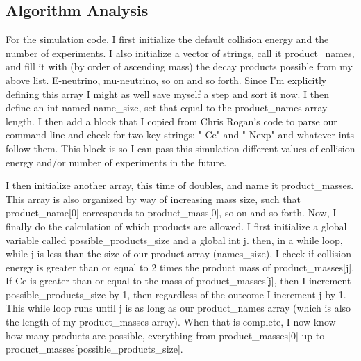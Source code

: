 \documentclass[11pt]{article}
\begin{document}
\subsection*{Algorithm Analysis}
For the simulation code, I first initialize the default collision energy and the number of experiments. I also initialize a vector of strings, call it product\_names, and fill it with (by order of ascending mass) the decay products possible from my above list. E-neutrino, mu-neutrino, so on and so forth. Since I'm explicitly defining this array I might as well save myself a step and sort it now. I then define an int named name\_size, set that equal to the product\_names array length. I then add a block that I copied from Chris Rogan's code to parse our command line and check for two key strings: "-Ce" and "-Nexp" and whatever ints follow them. This block is so I can pass this simulation different values of collision energy and/or number of experiments in the future. 

I then initialize another array, this time of doubles, and name it product\_masses. This array is also organized by way of increasing mass size, such that product\_name[0] corresponds to product\_mass[0], so on and so forth. Now, I finally do the calculation of which products are allowed. I first initialize a global variable called possible\_products\_size and a global int j. then, in a while loop, while j is less than the size of our product array (names\_size), I check if collision energy is greater than or equal to 2 times the product mass of product\_masses[j]. If Ce is greater than or equal to the mass of product\_masses[j], then I increment possible\_products\_size by 1, then regardless of the outcome I increment j by 1. This while loop runs until j is as long as our product\_names array (which is also the length of my product\_masses array). When that is complete, I now know how many products are possible, everything from product\_masses[0] up to product\_masses[possible\_products\_size]. 
\end{document}
